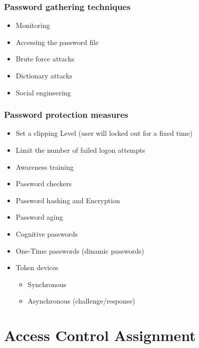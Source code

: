 \documentclass{beamer}
\begin{document}
\begin{frame}

\frametitle{Password gathering techniques}

\begin{itemize}
\item Monitoring
\item Accessing the password file
\item Brute force attacks
\item Dictionary attacks
\item Social engineering
\end{itemize}

\end{frame}

\begin{frame}

\frametitle{Password protection measures}

\begin{itemize}
\item Set a clipping Level (user will locked out for a fixed time)
\item Limit the number of failed logon attempts
\item Awareness training
\item Password checkers
\item Password hashing and Encryption
\item Password aging
\item Cognitive passwords
\item One-Time passwords  (dinamic passwords)
\item Token devices
   \begin{itemize}
   \item Synchronous
   \item Asynchronous (challenge/response)
   \end{itemize}
\end{itemize}

\end{frame}


\section{Access Control Assignment}

\end{document}
